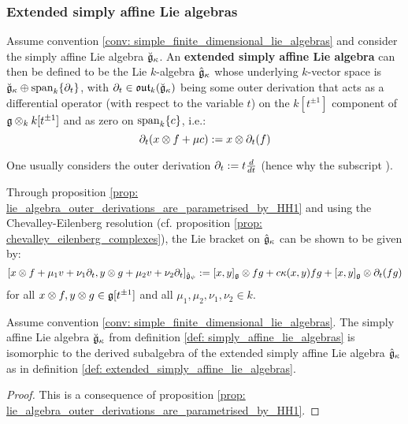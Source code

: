         \subsubsection{Extended simply affine Lie algebras}
            \begin{definition} \label{def: extended_simply_affine_lie_algebras}
                Assume convention \ref{conv: simple_finite_dimensional_lie_algebras} and consider the simply affine Lie algebra $\breve{\mathfrak{g}}_{\kappa}$. An \textbf{extended simply affine Lie algebra} can then be defined to be the Lie $k$-algebra $\hat{\mathfrak{g}}_{\kappa}$ whose underlying $k$-vector space is $\breve{\mathfrak{g}}_{\kappa} \oplus \operatorname{span}_k \{\partial_t\}$, with $\partial_t \in \mathfrak{out}_k(\breve{\mathfrak{g}}_{\kappa})$ being some outer derivation that acts as a differential operator (with respect to the variable $t$) on the $k[t^{\pm 1}]$ component of $\g \tensor_k k[t^{\pm 1}]$ and as zero on $\operatorname{span}_k \{c\}$, i.e.:
                    $$\del_t(x \tensor f + \mu c) := x \tensor \del_t(f)$$
            \end{definition}
            \begin{convention}
                One usually considers the outer derivation $\partial_t := t\frac{d}{dt}$ (hence why the subscript ). 
            \end{convention}
            \begin{remark} \label{remark: lie_brackets_on_extended_simply_affine_lie_algebras}
                Through proposition \ref{prop: lie_algebra_outer_derivations_are_parametrised_by_HH1} and using the Chevalley-Eilenberg resolution (cf. proposition \ref{prop: chevalley_eilenberg_complexes}), the Lie bracket on $\hat{\mathfrak{g}}_{\kappa}$ can be shown to be given by:
                    $$[x \tensor f + \mu_1 v + \nu_1 \del_t, y \tensor g + \mu_2 v + \nu_2 \del_t]_{\hat{\g}_{\psi}} := [x, y]_{\g} \tensor fg + c \kappa(x, y) fg + [x, y]_{\g} \tensor \del_t(fg)$$
                for all $x \tensor f, y \tensor g \in \g[t^{\pm 1}]$ and all $\mu_1, \mu_2, \nu_1, \nu_2 \in k$.
            \end{remark}
            
            \begin{proposition} \label{prop: simply_affine_Lie_algebras_as_derived_subalgebras}
                Assume convention \ref{conv: simple_finite_dimensional_lie_algebras}. The simply affine Lie algebra $\breve{\mathfrak{g}}_{\kappa}$ from definition \ref{def: simply_affine_lie_algebras} is isomorphic to the derived subalgebra of the extended simply affine Lie algebra $\hat{\mathfrak{g}}_{\kappa}$ as in definition \ref{def: extended_simply_affine_lie_algebras}.
            \end{proposition}
                \begin{proof}
                    This is a consequence of proposition \ref{prop: lie_algebra_outer_derivations_are_parametrised_by_HH1}.
                \end{proof}
          
